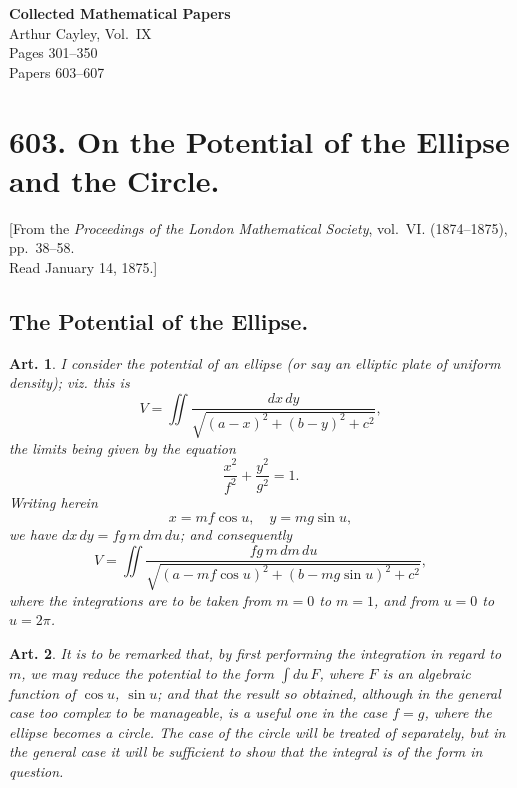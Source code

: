 \documentclass[12pt,a4paper]{article}
\theoremstyle{cayley}
\newtheorem{art}{Art.}[section]
\begin{document}
\begin{center}
{\LARGE\bfseries Collected Mathematical Papers\\[0.5em]}
{\Large Arthur Cayley, Vol.~IX\\[1em]}
{\large Pages 301--350\\[0.5em]}
{\normalsize Papers 603--607}
\end{center}

\vspace{2em}

\tableofcontents
\newpage


\newpage
\section[On the Potential of the Ellipse and the Circle]%
{603. On the Potential of the Ellipse and the Circle.}

\begin{center}
{\small [From the \textit{Proceedings of the London Mathematical Society}, vol.~VI. (1874--1875), pp.~38--58.\\
Read January 14, 1875.]}
\end{center}

\subsection*{The Potential of the Ellipse.}

\begin{art}
I consider the potential of an ellipse (or say an elliptic plate of uniform density); viz. this is
\[
V = \iint \frac{dx\,dy}{\sqrt{(a-x)^2 + (b-y)^2 + c^2}},
\]
the limits being given by the equation
\[
\frac{x^2}{f^2} + \frac{y^2}{g^2} = 1.
\]
Writing herein
\[ x = mf\cos u, \quad y = mg\sin u, \]
we have $dx\,dy = fg\,m\,dm\,du$; and consequently
\[
V = \iint \frac{fg\,m\,dm\,du}{\sqrt{(a - mf\cos u)^2 + (b - mg\sin u)^2 + c^2}},
\]
where the integrations are to be taken from $m=0$ to $m=1$, and from $u=0$ to $u=2\pi$.
\end{art}

\begin{art}
It is to be remarked that, by first performing the integration in regard to $m$, we may reduce the potential to the form $\int du\,F$, where $F$ is an algebraic function of $\cos u$, $\sin u$; and that the result so obtained, although in the general case too complex to be manageable, is a useful one in the case $f=g$, where the ellipse becomes a circle. The case of the circle will be treated of separately, but in the general case it will be sufficient to show that the integral is of the form in question.
\end{art}
\end{document}
